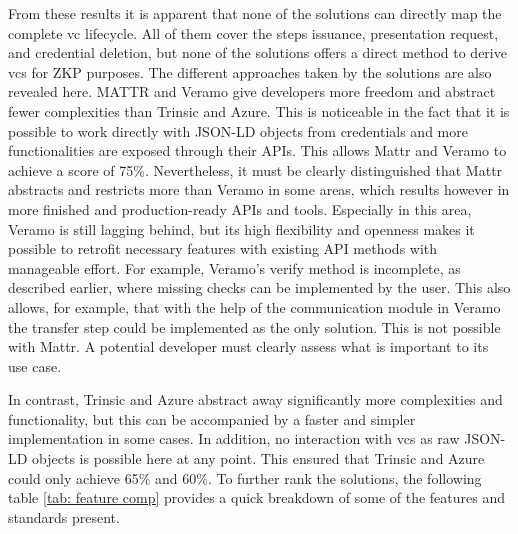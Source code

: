     From these results it is apparent that none of the solutions can directly map the complete \ac{vc} lifecycle. All of them cover the steps issuance, presentation request, and credential deletion, but none of the solutions offers a direct method to derive \acp{vc} for ZKP purposes. The different approaches taken by the solutions are also revealed here. MATTR and Veramo give developers more freedom and abstract fewer complexities than Trinsic and Azure. This is noticeable in the fact that it is possible to work directly with JSON-LD objects from credentials and more functionalities are exposed through their APIs. This allows Mattr and Veramo to achieve a score of 75\%. Nevertheless, it must be clearly distinguished that Mattr abstracts and restricts more than Veramo in some areas, which results however in more finished and production-ready APIs and tools. Especially in this area, Veramo is still lagging behind, but its high flexibility and openness makes it possible to retrofit necessary features with existing API methods with manageable effort. For example, Veramo's verify method is incomplete, as described earlier, where missing checks can be implemented by the user. This also allows, for example, that with the help of the communication module in Veramo the transfer step could be implemented as the only solution. This is not possible with Mattr. A potential developer must clearly assess what is important to its use case.
    
    In contrast, Trinsic and Azure abstract away significantly more complexities and functionality, but this can be accompanied by a faster and simpler implementation in some cases. In addition, no interaction with \acp{vc} as raw JSON-LD objects is possible here at any point. This ensured that Trinsic and Azure could only achieve 65\% and 60\%. To further rank the solutions, the following table \ref{tab: feature comp} provides a quick breakdown of some of the features and standards present.

